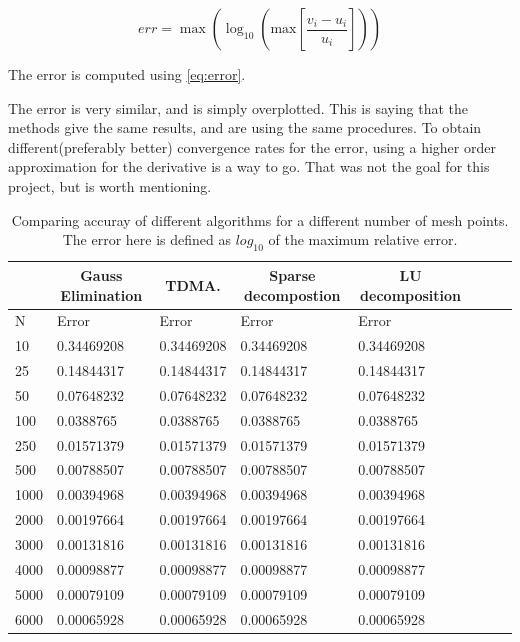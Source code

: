 \documentclass[11pt,a4paper,english]{article}
\numberwithin{equation}{section}
\begin{document}
\begin{equation}
err = \max \left(\log_{10} \left(\mathrm{max}\left[
\frac{v_i - u_i}{u_i} \right]\right)\right)
\label{eq:error}
\end{equation}


The error is computed using \eqref{eq:error}.


The error is very similar, and is simply overplotted. This is saying that the methods
give the same results, and are using the same procedures. To obtain different(preferably better) convergence rates for the error, using a higher order approximation for the derivative is a way to go. That was not the goal for this project, but is worth mentioning. 

\begin{table}[H]
\centering
\caption{Comparing accuray of different algorithms for a different number
of mesh points. The error here is defined as $log_{10}$ of the maximum 
relative error. }
\vspace{3mm}
\begin{tabular}{|l|l|l|l|l|l|l|l|}
\hline
\multicolumn{1}{|c|}{ } & \multicolumn{1}{|c|}{Gauss Elimination} & \multicolumn{1}{|c|}{TDMA.} & \multicolumn{1}{|c|}{Sparse decompostion} & \multicolumn{1}{|c|}{LU decomposition}  \\
\hline
N & Error & Error & Error & Error  \\
\hline
10 & 0.34469208 &  0.34469208 &  0.34469208 &  0.34469208\\
25 & 0.14844317 &  0.14844317 &  0.14844317 &  0.14844317\\
50 & 0.07648232 &  0.07648232 &  0.07648232 &  0.07648232\\
100 & 0.0388765  &  0.0388765  &  0.0388765  &  0.0388765 \\
250 & 0.01571379 &  0.01571379 &  0.01571379 &  0.01571379\\
500 & 0.00788507 &  0.00788507 &  0.00788507 &  0.00788507\\
1000 & 0.00394968 &  0.00394968 &  0.00394968 &  0.00394968\\
2000 & 0.00197664 &  0.00197664 &  0.00197664 &  0.00197664\\
3000 & 0.00131816 &  0.00131816 &  0.00131816 &  0.00131816\\
4000 & 0.00098877 &  0.00098877 &  0.00098877 &  0.00098877\\
5000 & 0.00079109 &  0.00079109 &  0.00079109 &  0.00079109\\
6000 & 0.00065928 &  0.00065928 &  0.00065928 &  0.00065928\\
\hline
\end{tabular}
\label{tab:err}
\end{table}
\end{document}
